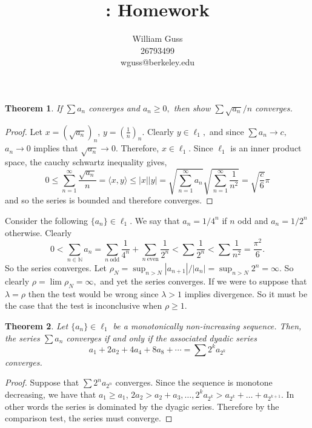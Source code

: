 \documentclass[letter]{article}
\title{\bCLASS: Homework \bHWN}
\author{William Guss\\26793499\\wguss@berkeley.edu}
\newtheorem{theorem}{Theorem}
\newenvironment{menumerate}{%
  \edef\backupindent{\the\parindent}%
  \enumerate%
  \setlength{\parindent}{\backupindent}%
}{\endenumerate}
\begin{document}
\maketitle
\thispagestyle{empty}

	\begin{menumerate}
		\setcounter{enumi}{58}
		\item %

		\begin{theorem}
			If $\sum a_n$ converges and $a_n \geq 0,$ then show $\sum \sqrt{a_n}/n$ converges.
		\end{theorem}

		\begin{proof}
			Let $x = (\sqrt{a_n})_n$, $y = \left(\frac{1}{n}\right)_n$. Clearly $y \in \ell_1,$ and since $\sum a_n \to c,$ $a_n \to 0$ implies that $\sqrt{a_n} \to 0.$ Therefore, $x \in \ell_1.$ Since $\ell_1$ is an inner product space, the cauchy schwartz inequality gives, 
			$$0 \leq \sum_{n=1}^\infty \frac{\sqrt{a_n}}{n} = \langle x,y \rangle \leq |x||y| = \sqrt{\sum_{n=1}^\infty a_n} \sqrt{\sum_{n=1}^\infty \frac{1}{n^2}} = \sqrt{\frac{c}{6}}\pi$$
			and so the series is bounded and therefore converges.
		\end{proof}

		\setcounter{enumi}{60}
		\item Consider the following $\{a_n\} \in \ell_1.$ We say that $a_n = 1/4^n$ if $n$ odd and $a_n = 1/2^n$ otherwise. Clearly $$0 < \sum_{n\in\mathbb{N}}a_n = \sum_{n\ \text{odd}} \frac{1}{4^n} + \sum_{n\ \text{even}} \frac{1}{2^n} < \sum \frac{1}{2^n} < \sum \frac{1}{n^2} = \frac{\pi^2}{6}.$$ So the series converges. Let $\rho_N = \sup_{n>N} |a_{n+1}|/|a_n| = \sup_{n>N} 2^n = \infty$. So clearly $\rho = \lim \rho_N = \infty,$ and yet the series converges. If we were to suppose that $\lambda = \rho$ then the test would be wrong since $\lambda > 1$ implies divergence. So it must be the case that the test is inconclusive when $\rho \geq 1.$
		\item 
		\begin{theorem}
			Let $\{a_n\} \in \ell_1$ be a monotonically non-increasing sequence. Then, the series $\sum a_n$ converges if and only if the associated dyadic series 
			$$a_1 + 2a_2 +4a_4 + 8a_8 + \cdots = \sum 2^k a_{2^k}$$
			converges.
		\end{theorem}

		\begin{proof}
		Suppose that $\sum 2^na_{2^n}$ converges. Since the sequence is monotone decreasing, we have that $a_1 \geq a_1$, $2a_2 > a_2 + a_3, \dots, 2^ka_{2^k} > a_{2^k} + \dots + a_{2^{k+1}}.$ In other words the series is dominated by the dyagic series. Therefore by the comparison test, the series must converge.


\end{proof}
\end{menumerate}
\end{document}

